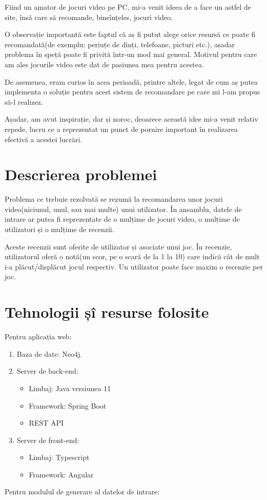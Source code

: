 \documentclass[12pt,a4paper]{report}
\begin{document}
	Fiind un amator de jocuri video pe PC, mi-a venit ideea de a face un astfel de site, însă care să recomande, bineînțeles, jocuri video.
	
	O observație importantă este faptul că aș fi putut alege orice resursă ce poate fi recomandată(de exemplu: periuțe de dinți, telefoane, picturi etc.), așadar problema în speță poate fi privită într-un mod mai general. Motivul pentru care am ales jocurile video este dat de pasiunea mea pentru acestea.
	
	De asemenea, eram curios în acea perioadă, printre altele, legat de cum aș putea implementa o soluție pentru acest sistem de recomandare pe care mi l-am propus să-l realizez.
	
	Așadar, am avut inspirație, dar și noroc, deoarece această idee mi-a venit relativ repede, lucru ce a reprezentat un punct de pornire important în realizarea efectivă a acestei lucrări.
	
	\newpage
	
\setcounter{secnumdepth}{3} 
\renewcommand*\thesection{\arabic{section}}
\section{Descrierea problemei}

Problema ce trebuie rezolvată se rezumă la recomandarea unor jocuri video(niciunul, unul, sau mai multe) unui utilizator. În ansamblu, datele de intrare ar putea fi reprezentate de o mulțime de jocuri video, o mulțime de utilizatori și o mulțime de recenzii.

Aceste recenzii sunt oferite de utilizator și asociate unui joc. În recenzie, utilizatorul oferă o notă(un scor, pe o scară de la 1 la 10) care indică cât de mult i-a plăcut/displăcut jocul respectiv. Un utilizator poate face maxim o recenzie per joc.
\section{Tehnologii șî resurse folosite}

Pentru aplicația web:

\begin{enumerate}
  \item Baza de date: Neo4j.
  \item Server de back-end:
  \begin{itemize}
     \item Limbaj: Java versiunea 11
     \item Framework: Spring Boot
     \item REST API
   \end{itemize}
  \item Server de front-end:
  \begin{itemize}
     \item Limbaj: Typescript
     \item Framework: Angular
   \end{itemize}
\end{enumerate}
Pentru modulul de generare al datelor de intrare:
\end{document}
